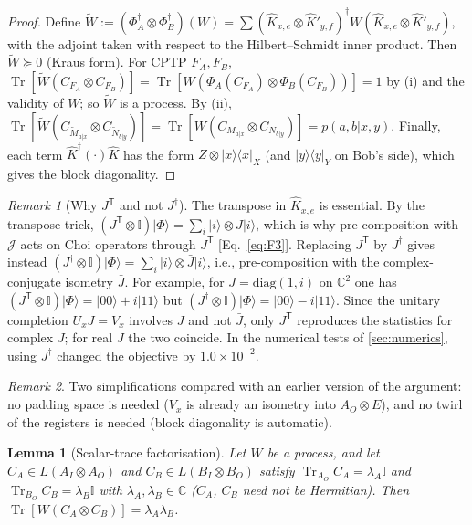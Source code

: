 \documentclass[aps,pra,onecolumn,notitlepage,superscriptaddress,longbibliography,nofootinbib,11pt]{revtex4-2}
\newtheorem{lemma}{Lemma}
\theoremstyle{remark}
\newtheorem{remark}{Remark}
\newcommand{\Tr}{\operatorname{Tr}}
\newcommand{\ket}[1]{\lvert #1\rangle}
\newcommand{\bra}[1]{\langle #1\rvert}
\newcommand{\one}{\mathbb{I}}
\newcommand{\tp}{\mathsf{T}}
\newcommand{\CC}{\mathbb{C}}
\begin{document}
\begin{proof}
Define $\widetilde W:=(\Phi_A^\dagger\otimes\Phi_B^\dagger)(W)=\sum(\hat K_{x,e}\otimes\hat K'_{y,f})^\dagger W(\hat K_{x,e}\otimes\hat K'_{y,f})$, with the adjoint taken with respect to the Hilbert--Schmidt inner product. Then $\widetilde W\succeq0$ (Kraus form). For CPTP $F_A,F_B$, $\Tr[\widetilde W(C_{F_A}\otimes C_{F_B})]=\Tr[W(\Phi_A(C_{F_A})\otimes\Phi_B(C_{F_B}))]=1$ by (i) and the validity of $W$; so $\widetilde W$ is a process. By (ii), $\Tr[\widetilde W(C_{\widetilde M_{a|x}}\otimes C_{\widetilde N_{b|y}})]=\Tr[W(C_{M_{a|x}}\otimes C_{N_{b|y}})]=p(a,b|x,y)$. Finally, each term $\hat K^\dagger(\cdot)\hat K$ has the form $Z\otimes\ket{x}\bra{x}_X$ (and $\ket{y}\bra{y}_Y$ on Bob's side), which gives the block diagonality.
\end{proof}

\begin{remark}[Why $J^\tp$ and not $J^\dagger$]\label{rem:transpose}
The transpose in $\hat K_{x,e}$ is essential. By the transpose trick, $(J^\tp\otimes\one)\ket{\Phi}=\sum_i\ket{i}\otimes J\ket{i}$, which is why pre-composition with $\mathcal J$ acts on Choi operators through $J^\tp$ [Eq.~\eqref{eq:F3}]. Replacing $J^\tp$ by $J^\dagger$ gives instead $(J^\dagger\otimes\one)\ket{\Phi}=\sum_i\ket{i}\otimes\bar J\ket{i}$, i.e., pre-composition with the complex-conjugate isometry $\bar J$. For example, for $J=\mathrm{diag}(1,i)$ on $\CC^2$ one has $(J^\tp\otimes\one)\ket{\Phi}=\ket{00}+i\ket{11}$ but $(J^\dagger\otimes\one)\ket{\Phi}=\ket{00}-i\ket{11}$. Since the unitary completion $U_xJ=V_x$ involves $J$ and not $\bar J$, only $J^\tp$ reproduces the statistics for complex $J$; for real $J$ the two coincide. In the numerical tests of \ref{sec:numerics}, using $J^\dagger$ changed the objective by $1.0\times10^{-2}$.
\end{remark}

\begin{remark}
Two simplifications compared with an earlier version of the argument: no padding space is needed ($V_x$ is already an isometry into $A_O\otimes E$), and no twirl of the registers is needed (block diagonality is automatic).
\end{remark}

\begin{lemma}[Scalar-trace factorisation]\label{lem:S-v2}
Let $W$ be a process, and let $C_A\in L(A_I\otimes A_O)$ and $C_B\in L(B_I\otimes B_O)$ satisfy $\Tr_{A_O}C_A=\lambda_A\one$ and $\Tr_{B_O}C_B=\lambda_B\one$ with $\lambda_A,\lambda_B\in\CC$ ($C_A$, $C_B$ need not be Hermitian). Then $\Tr[W(C_A\otimes C_B)]=\lambda_A\lambda_B$.
\end{lemma}
\end{document}
